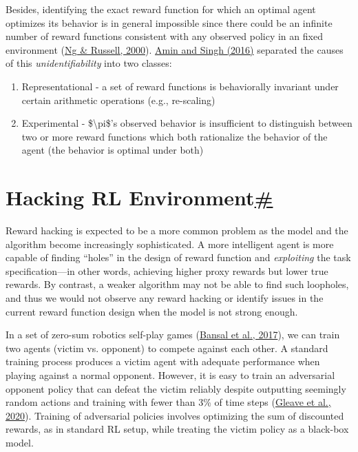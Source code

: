 Besides, identifying the exact reward function for which an optimal agent optimizes its behavior is in general impossible since there could be an infinite number of reward functions consistent with any observed policy in an fixed environment (\href{https://ai.stanford.edu/~ang/papers/icml00-irl.pdf}{Ng \& Russell, 2000}). \href{https://arxiv.org/abs/1601.06569}{Amin and Singh (2016)} separated the causes of this \emph{unidentifiability} into two classes:

\begin{enumerate}
\tightlist
\item
  Representational - a set of reward functions is behaviorally invariant under certain arithmetic operations (e.g., re-scaling)
\item
  Experimental - \$\textbackslash pi\$'s observed behavior is insufficient to distinguish between two or more reward functions which both rationalize the behavior of the agent (the behavior is optimal under both)
\end{enumerate}

\section{\texorpdfstring{Hacking RL Environment\hyperref[hacking-rl-environment]{\#}}{Hacking RL Environment\#}}\label{hacking-rl-environment}

Reward hacking is expected to be a more common problem as the model and the algorithm become increasingly sophisticated. A more intelligent agent is more capable of finding ``holes'' in the design of reward function and \emph{exploiting} the task specification---in other words, achieving higher proxy rewards but lower true rewards. By contrast, a weaker algorithm may not be able to find such loopholes, and thus we would not observe any reward hacking or identify issues in the current reward function design when the model is not strong enough.

In a set of zero-sum robotics self-play games (\href{https://arxiv.org/abs/1710.03748}{Bansal et al., 2017}), we can train two agents (victim vs. opponent) to compete against each other. A standard training process produces a victim agent with adequate performance when playing against a normal opponent. However, it is easy to train an adversarial opponent policy that can defeat the victim reliably despite outputting seemingly random actions and training with fewer than 3\% of time steps (\href{https://arxiv.org/abs/1905.10615}{Gleave et al., 2020}). Training of adversarial policies involves optimizing the sum of discounted rewards, as in standard RL setup, while treating the victim policy as a black-box model.

